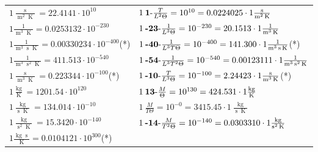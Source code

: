 \begin{center}
\begin{longtable}{l l}
{\color{black}$1 \bm{\mathrm{ }}\frac{\operatorname{s}}{\operatorname{m}^2\operatorname{K}} = 22.4141\cdot10^{10} $}&
	{\color{black}$1\:\text{\textbf{1}-} \frac{T}{L^2\Theta}=10^{10} = 0.0224025 \cdot 1 \bm{\mathrm{ }}\frac{\operatorname{s}}{\operatorname{m}^2\operatorname{K}}$}\\
{\color{black}$1 \bm{\mathrm{ }}\frac1{\operatorname{m}^3\operatorname{K}} = 0.0253132\cdot10^{-230} $}&
	{\color{black}$1\:\text{\textbf{-23}-} \frac1{L^3\Theta}=10^{-230} = 20.1513 \cdot 1 \bm{\mathrm{ }}\frac1{\operatorname{m}^3\operatorname{K}}$}\\
{\color{black}$1 \bm{\mathrm{ }}\frac1{\operatorname{m}^3\operatorname{s}\operatorname{K}} = 0.00330234\cdot10^{-400} $}\quad(*)&
	{\color{black}$1\:\text{\textbf{-40}-} \frac1{L^3T\Theta}=10^{-400} = 141.300 \cdot 1 \bm{\mathrm{ }}\frac1{\operatorname{m}^3\operatorname{s}\operatorname{K}}$}\quad(*)\\
{\color{black}$1 \bm{\mathrm{ }}\frac1{\operatorname{m}^3\operatorname{s}^2\operatorname{K}} = 411.513\cdot10^{-540} $}&
	{\color{black}$1\:\text{\textbf{-54}-} \frac1{L^3T^2\Theta}=10^{-540} = 0.00123111 \cdot 1 \bm{\mathrm{ }}\frac1{\operatorname{m}^3\operatorname{s}^2\operatorname{K}}$}\\
{\color{black}$1 \bm{\mathrm{ }}\frac{\operatorname{s}}{\operatorname{m}^3\operatorname{K}} = 0.223344\cdot10^{-100} $}\quad(*)&
	{\color{black}$1\:\text{\textbf{-10}-} \frac{T}{L^3\Theta}=10^{-100} = 2.24423 \cdot 1 \bm{\mathrm{ }}\frac{\operatorname{s}}{\operatorname{m}^3\operatorname{K}}$}\quad(*)\\
\hline{\color{black}$1 \bm{\mathrm{ }}\frac{\operatorname{kg}}{\operatorname{K}} = 1201.54\cdot10^{120} $}&
	{\color{black}$1\:\text{\textbf{13}-} \frac{M}{\Theta}=10^{130} = 424.531 \cdot 1 \bm{\mathrm{ }}\frac{\operatorname{kg}}{\operatorname{K}}$}\\
{\color{black}$1 \bm{\mathrm{ }}\frac{\operatorname{kg}}{\operatorname{s}\operatorname{K}} = 134.014\cdot10^{-10} $}&
	{\color{black}$1\:\text{} \frac{M}{T\Theta}=10^{-0} = 3415.45 \cdot 1 \bm{\mathrm{ }}\frac{\operatorname{kg}}{\operatorname{s}\operatorname{K}}$}\\
{\color{black}$1 \bm{\mathrm{ }}\frac{\operatorname{kg}}{\operatorname{s}^2\operatorname{K}} = 15.3420\cdot10^{-140} $}&
	{\color{black}$1\:\text{\textbf{-14}-} \frac{M}{T^2\Theta}=10^{-140} = 0.0303310 \cdot 1 \bm{\mathrm{ }}\frac{\operatorname{kg}}{\operatorname{s}^2\operatorname{K}}$}\\
{\color{black}$1 \bm{\mathrm{ }}\frac{\operatorname{kg}\operatorname{s}}{\operatorname{K}} = 0.0104121\cdot10^{300} $}\quad(*)&

\end{longtable}
\end{center}
